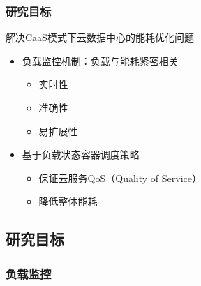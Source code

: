 
\begin{frame}
\frametitle{研究目标}
\begin{block}{解决CaaS模式下云数据中心的能耗优化问题}
    \begin{itemize}
        \item 负载监控机制：负载与能耗紧密相关
        \begin{itemize}
            \item 实时性
            \item 准确性
            \item 易扩展性
        \end{itemize}
        \item 基于负载状态容器调度策略
        \begin{itemize}
            \item 保证云服务QoS（Quality of Service）
            \item 降低整体能耗
        \end{itemize}
    \end{itemize}
\end{block}
\end{frame}

\subsection{研究目标}

\subsubsection{负载监控}

